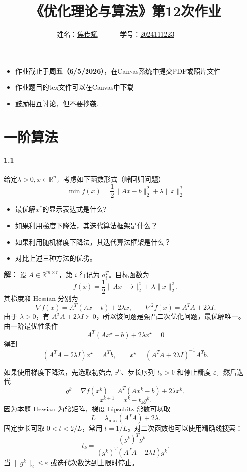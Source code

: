 \documentclass[12pt,a4paper]{article}
\begin{document}
\title{
{《优化理论与算法》第12次作业
}
}
\date{}

\author{
 姓名：\underline{焦传斌}~~~~~~
学号：\underline{2024111223}~~~~~~}

\maketitle
\begin{itemize}
	\item 作业截止于{\bf 周五（6/5/2026）}，在Canvas系统中提交PDF或照片文件
	\item 作业题目的tex文件可以在Canvas中下载
	\item 鼓励相互讨论，但不要抄袭.
\end{itemize}



\section{一阶算法}

\paragraph{1.1}  给定$\lambda>0, x\in \mathbb{R}^n$，考虑如下函数形式（岭回归问题）
$$\min f(x)=\frac{1}{2} \|Ax-b\|^2_2+\lambda \|x\|_2^2$$
\begin{itemize}
	\item 最优解$x^*$的显示表达式是什么?
	\item 如果利用梯度下降法，其迭代算法框架是什么？
	\item 如果利用随机梯度下降法，其迭代算法框架是什么？
	\item 对比上述三种方法的优劣。
\end{itemize}

\textbf{解：}
设 $A\in\mathbb R^{m\times n}$，第 $i$ 行记为 $a_i^T$。目标函数为
\[
  f(x)=\frac12\|Ax-b\|_2^2+\lambda\|x\|_2^2 .
\]
其梯度和 Hessian 分别为
\[
  \nabla f(x)=A^T(Ax-b)+2\lambda x,
  \qquad
  \nabla^2 f(x)=A^TA+2\lambda I.
\]
由于 $\lambda>0$，有 $A^TA+2\lambda I\succ0$，所以该问题是强凸二次优化问题，最优解唯一。由一阶最优性条件
\[
  A^T(Ax^\star-b)+2\lambda x^\star=0
\]
得到
\[
  (A^TA+2\lambda I)x^\star=A^Tb,
  \qquad
  \boxed{
  x^\star=(A^TA+2\lambda I)^{-1}A^Tb } .
\]

如果使用梯度下降法，先选取初始点 $x^0$、步长序列 $t_k>0$ 和停止精度 $\varepsilon$，然后迭代
\[
  g^k=\nabla f(x^k)=A^T(Ax^k-b)+2\lambda x^k,
\]
\[
  x^{k+1}=x^k-t_kg^k.
\]
因为本题 Hessian 为常矩阵，梯度 Lipschitz 常数可以取
\[
  L=\lambda_{\max}(A^TA)+2\lambda.
\]
固定步长可取 $0<t<2/L$，常用 $t=1/L$。对二次函数也可以使用精确线搜索：
\[
  t_k=\frac{(g^k)^Tg^k}{(g^k)^T(A^TA+2\lambda I)g^k}.
\]
当 $\|g^k\|_2\leq\varepsilon$ 或迭代次数达到上限时停止。
\end{document}
